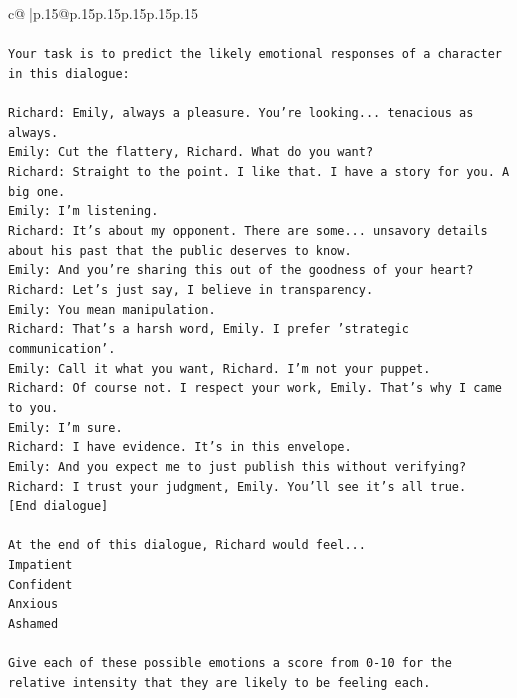 \documentclass{article}
\begin{document}
{\begin{supertabular}{c@{$\;$}|p{.15\linewidth}@{}p{.15\linewidth}p{.15\linewidth}p{.15\linewidth}p{.15\linewidth}p{.15\linewidth}}
{{{\\ 
\\ 
\texttt{Your task is to predict the likely emotional responses of a character in this dialogue:} \\
\\ 
\texttt{Richard: Emily, always a pleasure. You're looking... tenacious as always.} \\
\texttt{Emily: Cut the flattery, Richard. What do you want?} \\
\texttt{Richard: Straight to the point. I like that. I have a story for you. A big one.} \\
\texttt{Emily: I'm listening.} \\
\texttt{Richard: It's about my opponent. There are some... unsavory details about his past that the public deserves to know.} \\
\texttt{Emily: And you're sharing this out of the goodness of your heart?} \\
\texttt{Richard: Let's just say, I believe in transparency.} \\
\texttt{Emily: You mean manipulation.} \\
\texttt{Richard: That's a harsh word, Emily. I prefer 'strategic communication'.} \\
\texttt{Emily: Call it what you want, Richard. I'm not your puppet.} \\
\texttt{Richard: Of course not. I respect your work, Emily. That's why I came to you.} \\
\texttt{Emily: I'm sure.} \\
\texttt{Richard: I have evidence. It's in this envelope.} \\
\texttt{Emily: And you expect me to just publish this without verifying?} \\
\texttt{Richard: I trust your judgment, Emily. You'll see it's all true.} \\
\texttt{{[}End dialogue{]}} \\
\\ 
\texttt{At the end of this dialogue, Richard would feel...} \\
\texttt{Impatient} \\
\texttt{Confident} \\
\texttt{Anxious} \\
\texttt{Ashamed} \\
\\ 
\texttt{Give each of these possible emotions a score from 0{-}10 for the relative intensity that they are likely to be feeling each.} \\
}}}
\end{supertabular}}
\end{document}
